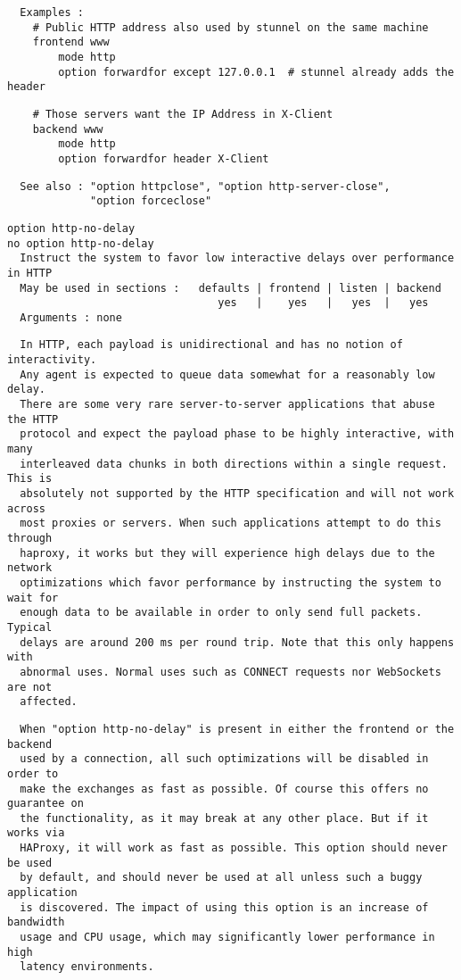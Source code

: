 \begin{verbatim}
  Examples :
    # Public HTTP address also used by stunnel on the same machine
    frontend www
        mode http
        option forwardfor except 127.0.0.1  # stunnel already adds the header
\end{verbatim}

\begin{verbatim}
    # Those servers want the IP Address in X-Client
    backend www
        mode http
        option forwardfor header X-Client
\end{verbatim}

\begin{verbatim}
  See also : "option httpclose", "option http-server-close",
             "option forceclose"
\end{verbatim}

\begin{verbatim}
option http-no-delay
no option http-no-delay
  Instruct the system to favor low interactive delays over performance in HTTP
  May be used in sections :   defaults | frontend | listen | backend
                                 yes   |    yes   |   yes  |   yes
  Arguments : none
\end{verbatim}

\begin{verbatim}
  In HTTP, each payload is unidirectional and has no notion of interactivity.
  Any agent is expected to queue data somewhat for a reasonably low delay.
  There are some very rare server-to-server applications that abuse the HTTP
  protocol and expect the payload phase to be highly interactive, with many
  interleaved data chunks in both directions within a single request. This is
  absolutely not supported by the HTTP specification and will not work across
  most proxies or servers. When such applications attempt to do this through
  haproxy, it works but they will experience high delays due to the network
  optimizations which favor performance by instructing the system to wait for
  enough data to be available in order to only send full packets. Typical
  delays are around 200 ms per round trip. Note that this only happens with
  abnormal uses. Normal uses such as CONNECT requests nor WebSockets are not
  affected.
\end{verbatim}

\begin{verbatim}
  When "option http-no-delay" is present in either the frontend or the backend
  used by a connection, all such optimizations will be disabled in order to
  make the exchanges as fast as possible. Of course this offers no guarantee on
  the functionality, as it may break at any other place. But if it works via
  HAProxy, it will work as fast as possible. This option should never be used
  by default, and should never be used at all unless such a buggy application
  is discovered. The impact of using this option is an increase of bandwidth
  usage and CPU usage, which may significantly lower performance in high
  latency environments.
\end{verbatim}

